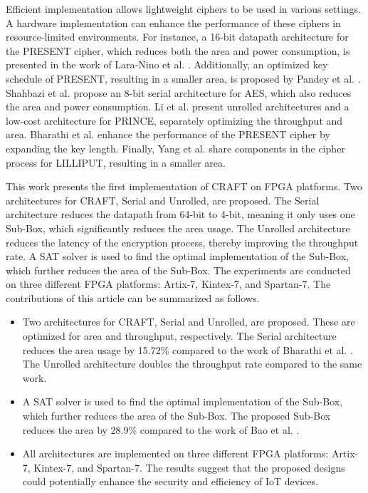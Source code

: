 \documentclass[final,5p,times,twocolumn]{elsarticle}
\begin{document}
Efficient implementation allows lightweight ciphers to be used in various settings. A hardware implementation can enhance the performance of these ciphers in resource-limited environments. For instance, a 16-bit datapath architecture for the PRESENT cipher, which reduces both the area and power consumption, is presented in the work of Lara-Nino et al. \cite{LaraNino2017}. Additionally, an optimized key schedule of PRESENT, resulting in a smaller area, is proposed by Pandey et al. \cite{Pandey2019}. Shahbazi et al. \cite{Shahbazi2021} propose an 8-bit serial architecture for AES, which also reduces the area and power consumption. Li et al. \cite{Li2021} present unrolled architectures and a low-cost architecture for PRINCE, separately optimizing the throughput and area. Bharathi et al. \cite{Bharathi2022} enhance the performance of the PRESENT cipher by expanding the key length. Finally, Yang et al. \cite{Yang2023} share components in the cipher process for LILLIPUT, resulting in a smaller area.


This work presents the first implementation of CRAFT on FPGA platforms. Two architectures for CRAFT, Serial and Unrolled, are proposed. The Serial architecture reduces the datapath from 64-bit to 4-bit, meaning it only uses one Sub-Box, which significantly reduces the area usage. The Unrolled architecture reduces the latency of the encryption process, thereby improving the throughput rate. A SAT solver is used to find the optimal implementation of the Sub-Box, which further reduces the area of the Sub-Box. The experiments are conducted on three different FPGA platforms: Artix-7, Kintex-7, and Spartan-7. The contributions of this article can be summarized as follows.
\begin{itemize}
    \item Two architectures for CRAFT, Serial and Unrolled, are proposed. These are optimized for area and throughput, respectively. The Serial architecture reduces the area usage by 15.72\% compared to the work of Bharathi et al. \cite{Bharathi2022}. The Unrolled architecture doubles the throughput rate compared to the same work.
    \item A SAT solver is used to find the optimal implementation of the Sub-Box, which further reduces the area of the Sub-Box. The proposed Sub-Box reduces the area by 28.9\% compared to the work of Bao et al. \cite{bao2019peigen}.
    \item All architectures are implemented on three different FPGA platforms: Artix-7, Kintex-7, and Spartan-7. The results suggest that the proposed designs could potentially enhance the security and efficiency of IoT devices.
\end{itemize}
\end{document}
